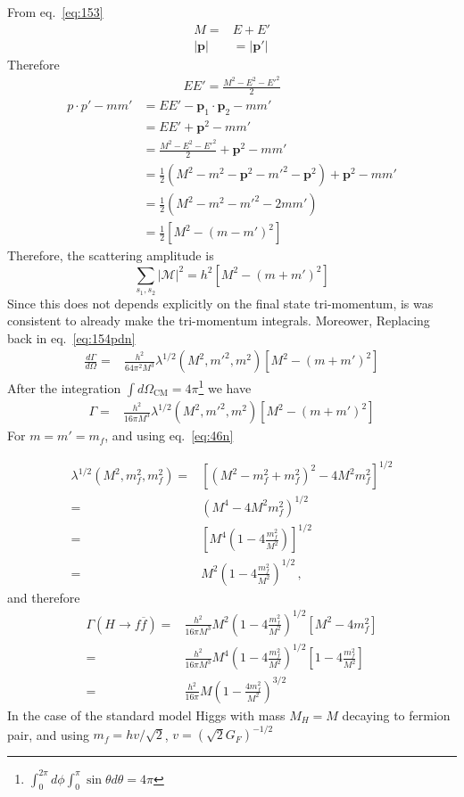 From eq.~\eqref{eq:153}
\begin{align}
  M=&E+{E'}\nonumber\\
|\mathbf{p}|&=|\mathbf{p}'|
\end{align}
Therefore
\begin{align}
  E{E'}=\frac{M^2-E^2-{E'}^2}{2}
\end{align}
\begin{align*}
  p\cdot p'-m {m'}&=EE'-\mathbf{p}_{1}\cdot\mathbf{p}_{2}-m {m'}\\
&=EE'+\mathbf{p}^2-m {m'}\\
&=\frac{M^2-E^2-{E'}^2}{2}+\mathbf{p}^2-m {m'}\nonumber\\
&=\frac12\left(M^2-m^2-\mathbf{p}^2-{m'}^2-\mathbf{p}^2\right)+\mathbf{p}^2-m {m'}\\
&=\frac12\left(M^2-m^2-{m'}^2-2m{m'}\right)\\
&=\frac12\left[M^2-(m-{m'})^2\right]
\end{align*}
Therefore, the scattering  amplitude is
\begin{equation}
\sum_{s_1,s_2}|\mathcal{M}|^{2}=h^2\left[M^2-(m+{m'})^2\right]
\end{equation}
Since this does not depends explicitly on the final state tri-momentum, is was consistent to already make the tri-momentum integrals. Moreower, Replacing back in eq.~\eqref{eq:154pdn}
\begin{align}
\frac{d\Gamma}{d\Omega}=
&\frac{h^2}{64 \pi^2M^3}\lambda^{1/2}(M^2,{m'}^2,m^2)\left[M^2-(m+{m'})^2\right]
\end{align}
After the integration $\int d\Omega_{\text{CM}}=4\pi$\footnote{$\int_0^{2\pi}d\phi\int_0^\pi\sin\theta d\theta=4\pi $} we have
\begin{align}
\Gamma=&\frac{h^2}{16 \pi M^3}\lambda^{1/2}(M^2,{m'}^2,m^2)\left[M^2-(m+{m'})^2\right]
\end{align}
For $m={m'}=m_f$, and using eq.~\eqref{eq:46n}


\begin{align}
  \lambda^{1/2}(M^2,m^2_f,m_f^2)=&
  \left[ \left( M^2-m^2_f+m^2_f  \right)^2-4 M^2m_f^2  \right]^{1/2}\nonumber\\
  =&\left( M^4-4 M^2m_f^2  \right)^{1/2}\nonumber\\
  =&\left[M^4 \left( 1-4 \frac{m_f^2}{M^2} \right) \right]^{1/2}\nonumber\\
  =&M^2 \left( 1-4 \frac{m_f^2}{M^2} \right)^{1/2}\,,
\end{align}
and therefore
\begin{align}
\Gamma(H\to f\overline{f})=&\frac{h^2}{16 \pi M^3}M^2 \left( 1-4 \frac{m_f^2}{M^2} \right)^{1/2}
 \left[M^2-4m_f^2\right] \nonumber\\
=&\frac{h^2}{16 \pi M^3}M^4 \left( 1-4 \frac{m_f^2}{M^2} \right)^{1/2}
 \left[1-4 \frac{m_f^2}{M^2}\right] \nonumber\\
=&\frac{h^2}{16 \pi}M\left(1-\frac{4m_f^2}{M^2}\right)^{3/2}
\end{align}
In the case of the standard model Higgs with mass $M_H=M$ decaying to fermion pair, and using $m_f=hv/\sqrt{2}$,  $v=\left( \sqrt{2}G_F \right)^{-1/2}$


